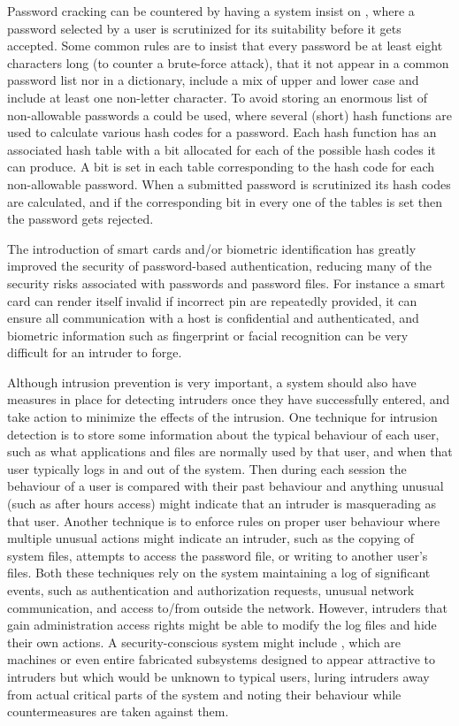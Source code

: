 Password cracking can be countered by having a system insist on ,
where a password selected by a user is scrutinized for its suitability before it
gets accepted. Some common rules are to insist that
every password be at least eight characters long (to counter a brute-force attack),
that it not appear in a common password list nor in a dictionary, include
a mix of upper and lower case and include at least one non-letter character.
To avoid storing an enormous list of non-allowable passwords a 
could be used, where several (short) hash functions are used to
calculate various hash codes for a password. Each hash function has an associated
hash table with a bit allocated for each of the possible hash codes it can produce.
A bit is set in each table corresponding to the hash code for each non-allowable password.
When a submitted password is scrutinized its hash codes are calculated, and if
the corresponding bit in every one of the tables is set then the password gets rejected.

The introduction of smart cards and/or biometric identification has greatly improved
the security of password-based authentication, reducing many of the security risks
associated with passwords and password files.
For instance a smart card can render itself invalid if incorrect pin are repeatedly provided,
it can ensure all communication with a host is confidential and authenticated,
and biometric information such as fingerprint or facial recognition can be
very difficult for an intruder to forge.

Although intrusion prevention is very important, a system should also have measures
in place for detecting intruders once they have successfully entered, and take
action to minimize the effects of the intrusion.
One technique for intrusion detection is to store some information about the
typical behaviour of each user, such as what applications and files are normally
used by that user, and when that user typically logs in and out of the system.
Then during each session the behaviour of a user is compared with their past
behaviour and anything unusual (such as after hours access) might indicate that
an intruder is masquerading as that user.
Another technique is to enforce rules on proper user behaviour where multiple unusual actions
might indicate an intruder, such as the copying of system files, attempts
to access the password file, or writing to another user's files.
Both these techniques rely on the system maintaining a log of significant
events, such as authentication and authorization requests, unusual network communication,
and access to/from outside the network.
However, intruders that gain administration access rights might be able to modify
the log files and hide their own actions.
A security-conscious system might include , which are
machines or even entire fabricated subsystems designed to appear attractive
to intruders but which would be unknown to typical users,
luring intruders away from actual critical parts of the system and noting their
behaviour while countermeasures are taken against them.


